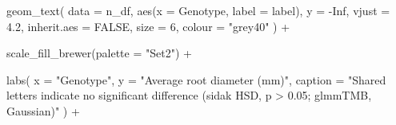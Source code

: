 \documentclass[
  letterpaper,
  DIV=11,
  numbers=noendperiod]{scrartcl}
\newenvironment{Shaded}{\begin{snugshade}}{\end{snugshade}}
\newcommand{\AttributeTok}[1]{\textcolor[rgb]{0.40,0.45,0.13}{#1}}
\newcommand{\ConstantTok}[1]{\textcolor[rgb]{0.56,0.35,0.01}{#1}}
\newcommand{\DecValTok}[1]{\textcolor[rgb]{0.68,0.00,0.00}{#1}}
\newcommand{\FloatTok}[1]{\textcolor[rgb]{0.68,0.00,0.00}{#1}}
\newcommand{\FunctionTok}[1]{\textcolor[rgb]{0.28,0.35,0.67}{#1}}
\newcommand{\NormalTok}[1]{\textcolor[rgb]{0.00,0.23,0.31}{#1}}
\newcommand{\SpecialCharTok}[1]{\textcolor[rgb]{0.37,0.37,0.37}{#1}}
\newcommand{\StringTok}[1]{\textcolor[rgb]{0.13,0.47,0.30}{#1}}
\begin{document}
\begin{Shaded}
\begin{Highlighting}[]
  \FunctionTok{geom\_text}\NormalTok{(}
    \AttributeTok{data        =}\NormalTok{ n\_df,}
    \FunctionTok{aes}\NormalTok{(}\AttributeTok{x =}\NormalTok{ Genotype, }\AttributeTok{label =}\NormalTok{ label),}
    \AttributeTok{y           =} \SpecialCharTok{{-}}\ConstantTok{Inf}\NormalTok{,}
    \AttributeTok{vjust       =} \FloatTok{4.2}\NormalTok{,}
    \AttributeTok{inherit.aes =} \ConstantTok{FALSE}\NormalTok{,}
    \AttributeTok{size        =} \DecValTok{6}\NormalTok{,}
    \AttributeTok{colour      =} \StringTok{"grey40"}
\NormalTok{  ) }\SpecialCharTok{+}

  \FunctionTok{scale\_fill\_brewer}\NormalTok{(}\AttributeTok{palette =} \StringTok{"Set2"}\NormalTok{) }\SpecialCharTok{+}

  \FunctionTok{labs}\NormalTok{(}
    \AttributeTok{x       =} \StringTok{"Genotype"}\NormalTok{,}
    \AttributeTok{y       =} \StringTok{"Average root diameter (mm)"}\NormalTok{,}
    \AttributeTok{caption =} \StringTok{"Shared letters indicate no significant difference (sidak HSD, p \textgreater{} 0.05; glmmTMB, Gaussian)"}
\NormalTok{  ) }\SpecialCharTok{+}


\end{Highlighting}
\end{Shaded}
\end{document}
